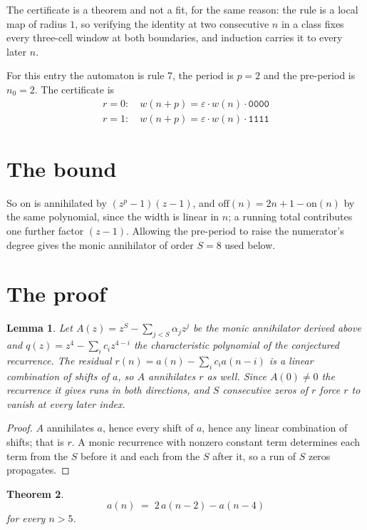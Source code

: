 \documentclass[11pt,a4paper]{article}
\theoremstyle{plain}
\newtheorem{theorem}{Theorem}
\newtheorem{lemma}[theorem]{Lemma}
\theoremstyle{definition}
\begin{document}
The certificate is a theorem and not a fit, for the same reason: the rule is a local map of
radius $1$, so verifying the identity at two consecutive $n$ in a class fixes every three-cell
window at both boundaries, and induction carries it to every later $n$.

For this entry the automaton is rule 7, the period is $p=2$ and the pre-period is $n_0=2$.
The certificate is
\begin{gather*}
r=0:\quad w(n+p) = \varepsilon \cdot w(n) \cdot \texttt{0000} \\
r=1:\quad w(n+p) = \varepsilon \cdot w(n) \cdot \texttt{1111}
\end{gather*}

\section{The bound}

So
$\mathrm{on}$ is annihilated by $(z^p-1)(z-1)$, and $\mathrm{off}(n)=2n+1-\mathrm{on}(n)$ by
the same polynomial, since the width is linear in $n$; a running total contributes one further
factor $(z-1)$. Allowing the pre-period to raise the numerator's degree gives the monic
annihilator of order $S=8$ used below.

\section{The proof}

\begin{lemma}\label{lem:crit}
Let $A(z)=z^S-\sum_{j<S}\alpha_jz^{j}$ be the monic annihilator derived above and
$q(z)=z^{4}-\sum_ic_iz^{4-i}$ the characteristic polynomial of the conjectured
recurrence. The residual $r(n)=a(n)-\sum_ic_ia(n-i)$ is a linear combination of shifts of $a$,
so $A$ annihilates $r$ as well. Since $A(0)\ne0$ the recurrence it gives runs in both
directions, and $S$ consecutive zeros of $r$ force $r$ to vanish at every later index.
\end{lemma}

\begin{proof}
$A$ annihilates $a$, hence every shift of $a$, hence any linear combination of shifts; that is
$r$. A monic recurrence with nonzero constant term determines each term from the $S$ before it
and each from the $S$ after it, so a run of $S$ zeros propagates.
\end{proof}

\begin{theorem}
\[
a(n)\;=\;2\,a(n-2) - a(n-4)
\]
for every $n>5$.
\end{theorem}
\end{document}
